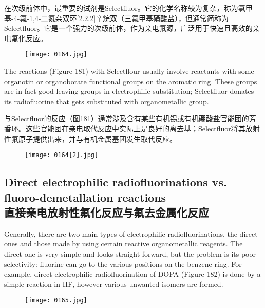 \documentclass[dvipsnames, svgnames,a4paper,11pt]{article}
\begin{document}
在次级前体中，最重要的试剂是Selectfluor。它的化学名称较为复杂，称为氯甲基-4-氟-1,4-二氮杂双环[2.2.2]辛烷双（三氟甲基磺酸盐），但通常简称为Selectfluor。它是一个强力的次级前体，作为亲电氟源，广泛用于快速且高效的亲电氟化反应。

\begin{figure}[h]
	\centering
    \texttt{[image: 0164.jpg]}    
     \label{fig180}
\end{figure}

The reactions (Figure 181) with Selectflour usually involve reactants with some
organotin or organoborate functional groups on the aromatic ring. These groups are
in fact good leaving groups in electrophilic substitution; Selectfluor donates its
radiofluorine that gets substituted with organometallic group.

与Selectfluor的反应（图181）通常涉及含有某些有机锡或有机硼酸盐官能团的芳香环。这些官能团在亲电取代反应中实际上是良好的离去基；Selectfluor将其放射性氟原子提供出来，并与有机金属基团发生取代反应。

\begin{figure}[h]
	\centering
    \texttt{[image: 0164[2].jpg]}    
     \label{fig181}
\end{figure}

\newpage
\subsection{Direct electrophilic radiofluorinations vs. fluoro-demetallation reactions \\直接亲电放射性氟化反应与氟去金属化反应}

Generally, there are two main types of electrophilic radiofluorinations, the direct ones
and those made by using certain reactive organometallic reagents. The direct one is
very simple and looks straight-forward, but the problem is its poor selectivity: fluorine
can go to the various positions on the benzene ring. For example, direct electrophilic
radiofluorination of DOPA (Figure 182) is done by a simple reaction in HF, however
various unwanted isomers are formed.

\begin{figure}[h]
	\centering
    \texttt{[image: 0165.jpg]}    
     \label{fig182}
\end{figure}
\end{document}
